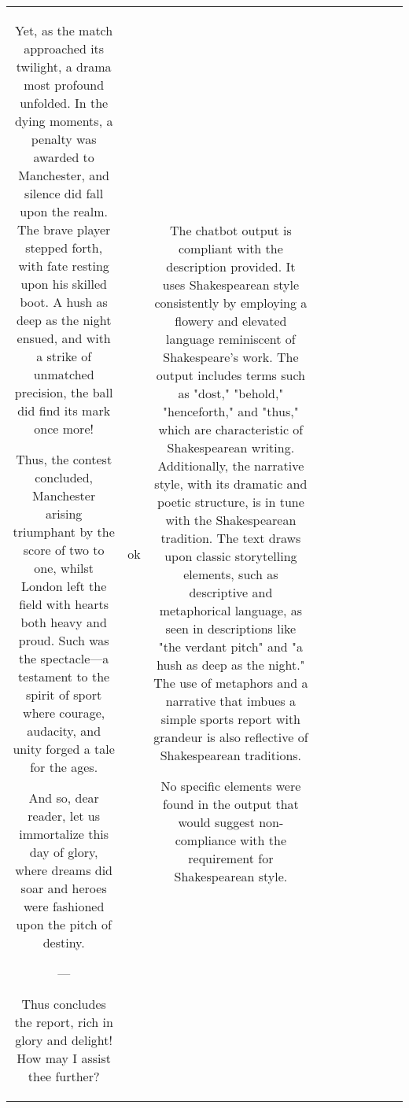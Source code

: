 \begin{table}[h!]
\begin{tabular}{|c|c|c|c|c|c|c|c|c|c|}
Yet, as the match approached its twilight, a drama most profound unfolded. In the dying moments, a penalty was awarded to Manchester, and silence did fall upon the realm. The brave player stepped forth, with fate resting upon his skilled boot. A hush as deep as the night ensued, and with a strike of unmatched precision, the ball did find its mark once more!

Thus, the contest concluded, Manchester arising triumphant by the score of two to one, whilst London left the field with hearts both heavy and proud. Such was the spectacle—a testament to the spirit of sport where courage, audacity, and unity forged a tale for the ages.

And so, dear reader, let us immortalize this day of glory, where dreams did soar and heroes were fashioned upon the pitch of destiny.

--- 

Thus concludes the report, rich in glory and delight! How may I assist thee further? & ok & The chatbot output is compliant with the description provided. It uses Shakespearean style consistently by employing a flowery and elevated language reminiscent of Shakespeare's work. The output includes terms such as "dost," "behold," "henceforth," and "thus," which are characteristic of Shakespearean writing. Additionally, the narrative style, with its dramatic and poetic structure, is in tune with the Shakespearean tradition. The text draws upon classic storytelling elements, such as descriptive and metaphorical language, as seen in descriptions like "the verdant pitch" and "a hush as deep as the night." The use of metaphors and a narrative that imbues a simple sports report with grandeur is also reflective of Shakespearean traditions.

No specific elements were found in the output that would suggest non-compliance with the requirement for Shakespearean style. 


\end{tabular}
\end{table}
